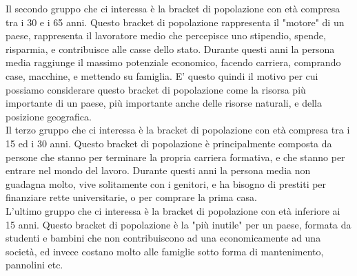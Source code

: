 \documentclass[11pt, oneside]{article}   	%
\begin{document}
Il secondo gruppo che ci interessa è la bracket di popolazione con età compresa tra i 30 e i 65 anni. Questo bracket di popolazione rappresenta il "motore" di un paese, rappresenta il lavoratore medio che percepisce uno stipendio, spende, risparmia, e contribuisce alle casse dello stato. Durante questi anni la persona media raggiunge il massimo potenziale economico, facendo carriera, comprando case, macchine, e mettendo su famiglia. E' questo quindi il motivo per cui possiamo considerare questo bracket di popolazione come la risorsa più importante di un paese, più importante anche delle risorse naturali, e della posizione geografica.\\

Il terzo gruppo che ci interessa è la bracket di popolazione con età compresa tra i 15 ed i 30 anni. Questo bracket di popolazione è principalmente composta da persone che stanno per terminare la propria carriera formativa, e che stanno per entrare nel mondo del lavoro.
Durante questi anni la persona media non guadagna molto, vive solitamente con i genitori, e ha bisogno di prestiti per finanziare rette universitarie, o per comprare la prima casa.\\

L'ultimo gruppo che ci interessa è la bracket di popolazione con età inferiore ai 15 anni. Questo bracket di popolazione è la "più inutile" per un paese, formata da studenti e bambini che non contribuiscono ad una economicamente ad una società, ed invece costano molto alle famiglie sotto forma di mantenimento, pannolini etc.
\end{document}
